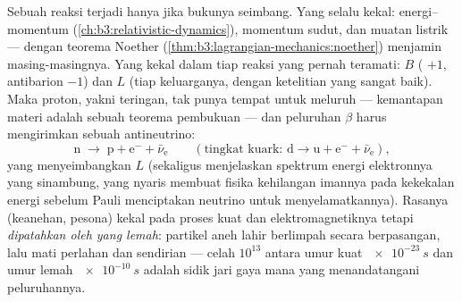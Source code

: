 \begin{proposition}\label{prop:b3:particle-physics:conservation}
Sebuah reaksi terjadi hanya jika bukunya seimbang. Yang selalu
kekal: energi--momentum
(\cref{ch:b3:relativistic-dynamics}), momentum sudut, dan
muatan listrik --- dengan teorema Noether
(\cref{thm:b3:lagrangian-mechanics:noether}) menjamin masing-masingnya.
Yang kekal dalam tiap reaksi yang pernah teramati: \emph{}
$B$ ( $+1$, antibarion $-1$) dan \emph{}
$L$ (tiap keluarganya, dengan ketelitian yang sangat baik). Maka proton, yakni
 teringan, tak punya tempat untuk meluruh --- kemantapan materi adalah
sebuah teorema pembukuan --- dan peluruhan $\beta$ harus mengirimkan sebuah
antineutrino:
\[
\text{n} \;\to\; \text{p} + \text{e}^- + \bar\nu_{\text{e}}
\qquad (\text{tingkat kuark: } \text{d} \to \text{u} +
\text{e}^- + \bar\nu_{\text{e}}) ,
\]
yang menyeimbangkan $L$ (sekaligus menjelaskan spektrum energi elektronnya
yang sinambung, yang nyaris membuat fisika kehilangan imannya pada kekekalan
energi sebelum Pauli menciptakan neutrino untuk menyelamatkannya).
Rasanya (keanehan, pesona) kekal pada proses kuat dan
elektromagnetiknya tetapi \emph{dipatahkan oleh yang lemah}: partikel aneh
lahir berlimpah secara berpasangan, lalu mati perlahan dan sendirian
--- celah $10^{13}$ antara umur kuat $\qty{e-23}{s}$
dan umur lemah $\qty{e-10}{s}$ adalah sidik jari gaya mana yang
menandatangani peluruhannya.
\end{proposition}
\admitted

